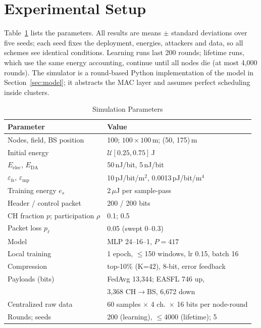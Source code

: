 \documentclass[journal]{IEEEtran}
\begin{document}
\section{Experimental Setup}\label{sec:setup}
Table~\ref{tab:params} lists the parameters. All results are means $\pm$ standard deviations over five seeds; each seed fixes the deployment, energies, attackers and data, so all schemes see identical conditions. Learning runs last 200 rounds; lifetime runs, which use the same energy accounting, continue until all nodes die (at most 4,000 rounds). The simulator is a round-based Python implementation of the model in Section~\ref{sec:model}; it abstracts the MAC layer and assumes perfect scheduling inside clusters.

\begin{table}[t]
\caption{Simulation Parameters}\label{tab:params}
\centering\scriptsize
\begin{tabular}{@{}ll@{}}
\toprule
Parameter & Value\\
\midrule
Nodes, field, BS position & 100; $100\times100$\,m; (50, 175)\,m\\
Initial energy & $\mathcal{U}[0.25,0.75]$\,J\\
$E_{\mathrm{elec}}$, $E_{\mathrm{DA}}$ & 50\,nJ/bit, 5\,nJ/bit\\
$\varepsilon_{\mathrm{fs}}$, $\varepsilon_{\mathrm{mp}}$ & 10\,pJ/bit/m$^2$, 0.0013\,pJ/bit/m$^4$\\
Training energy $e_s$ & 2\,$\mu$J per sample-pass\\
Header / control packet & 200 / 200 bits\\
CH fraction $p$; participation $\rho$ & 0.1; 0.5\\
Packet loss $p_\ell$ & 0.05 (swept 0--0.3)\\
Model & MLP 24--16--1, $P=417$\\
Local training & 1 epoch, $\le$150 windows, lr 0.15, batch 16\\
Compression & top-10\% (K=42), 8-bit, error feedback\\
Payloads (bits) & FedAvg 13,344; EASFL 746 up,\\
 & 3,368 CH$\to$BS, 6,672 down\\
Centralized raw data & 60 samples $\times$ 4 ch.\ $\times$ 16 bits per node-round\\
Rounds; seeds & 200 (learning), $\le$4000 (lifetime); 5\\
\bottomrule
\end{tabular}
\end{table}
\end{document}
